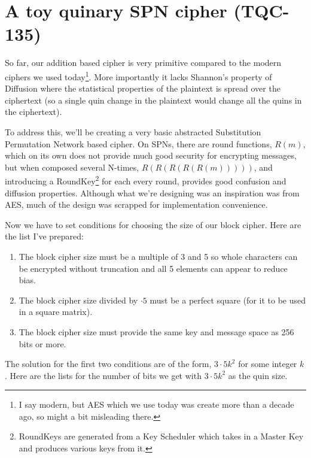 \documentclass{article}
\begin{document}

\section{A toy quinary SPN cipher (TQC-135)}

So far, our addition based cipher is very primitive compared to the modern
ciphers we used today\footnote{I say modern, but AES which we use today
was create more than a decade ago, so might a bit misleading there.}.
More importantly it lacks Shannon's property of Diffusion where the 
statistical properties of the plaintext is spread over the ciphertext
(so a single quin change in the plaintext would change all the quins in
the ciphertext).

To address this, we'll be creating a very basic abstracted Substitution Permutation Network
based cipher. On SPNs, there are round functions, $R(m)$, which on its
own does not provide much good security for encrypting messages, but when
composed several N-times, $R(R(R(R(R(m)))))$, and introducing a RoundKey\footnote{RoundKeys
are generated from a Key Scheduler which takes in a Master Key and produces various keys
from it.}
for each every round, provides good confusion and diffusion properties. Although
what we're designing was an inspiration was from AES, much of the design
was scrapped for implementation convenience.

Now we have to set conditions for choosing the size of
our block cipher. Here are the list I've prepared:

\begin{enumerate}

\item The block cipher size must be a multiple of 3 and 5 so whole characters
can be encrypted without truncation and all 5 elements can appear to reduce bias.

\item The block cipher size divided by $\cdot 5$ must be a perfect square (for
it to be used in a square matrix).

\item The block cipher size must provide the same key and message space
as 256 bits or more.

\end{enumerate}

The solution for the first two conditions are of the form, $3\cdot 5k^2$ for some integer $k$. Here
are the lists for the number of bits we get with $3\cdot 5k^2$ as the quin size.
\end{document}
